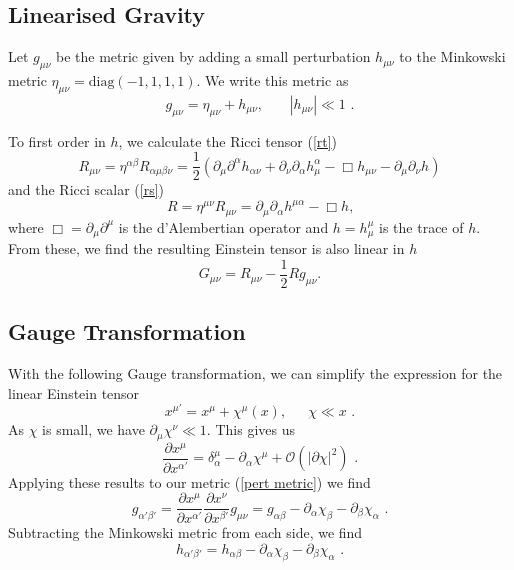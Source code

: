 \documentclass[12pt,twoside,a4paper]{report}
\newcommand{\mn}{_{\mu\nu}}
\newcommand{\fs}{\text{ .}}
\newcommand{\pd}{\partial}
\begin{document}
\subsection{Linearised Gravity}
Let $g\mn$ be the metric given by adding a small perturbation $h_{\mu\nu}$ to the Minkowski metric $\eta\mn=\text{diag}(-1,1,1,1)$. We write this metric as 
\begin{equation} \label{pert metric}
g\mn=\eta_{\mu\nu}+h_{\mu\nu} \text{, } \hspace{20pt} |h_{\mu\nu}| \ll 1 \text{ .}
\end{equation}

To first order in $h$, we calculate the Ricci tensor (\ref{rt})
\begin{equation} \label{lin rt}
R\mn =\eta^{\alpha \beta}R_{\alpha \mu \beta \nu} = \frac{1}{2}\left( \pd_\mu \pd ^\alpha h_{\alpha \nu} + \pd_\nu \pd_\alpha h^\alpha_\mu -\Box h\mn -\pd_\mu \pd_\nu h \right)
\end{equation}
and the Ricci scalar (\ref{rs}) 
\begin{equation} \label{lin rs}
R=\eta^{\mu \nu}R\mn=\pd _\mu \pd_ \alpha h^{\mu \alpha} - \Box h \textbf{,}
\end{equation}
where $\Box=\pd_\mu \pd^\mu $ is the d'Alembertian operator and $h=h^\mu_\mu$ is the trace of $h$. From these, we find the resulting Einstein tensor is also linear in $h$ 
\begin{equation} \label{lin Einstein}
G\mn =R\mn -\frac{1}{2} R g\mn \textbf{.}
\end{equation}

\subsection{Gauge Transformation}
With the following Gauge transformation, we can simplify the expression for the linear Einstein tensor
\begin{equation}
x^{\mu'}=x^\mu +\chi ^\mu (x)\text{,} \hspace{20pt}\chi \ll x\fs
\end{equation} 
As $\chi$ is small, we have $\partial_\mu \chi^\nu \ll 1$. This gives us
\begin{equation}
\frac{\pd x^\mu}{\pd x^{\alpha'}}=\delta^\mu_\alpha-\pd_\alpha\chi^\mu +\mathcal{O}(|\pd \chi|^2) \fs
\end{equation}  
Applying these results to our metric (\ref{pert metric}) we find
\begin{equation} 
g_{\alpha' \beta'}=\frac{\pd x^\mu}{\pd x^{\alpha'}}\frac{\pd x^\nu}{\pd x^{\beta'}}g\mn=g_{\alpha \beta}-\pd_\alpha \chi_\beta -\pd_\beta \chi_\alpha \fs
\end{equation}
Subtracting the Minkowski metric from each side, we find 
\begin{equation} \label{pert transf}
h_{\alpha' \beta'}=h_{\alpha \beta}-\pd_\alpha\chi_\beta-\pd_\beta\chi_\alpha \fs
\end{equation}
\end{document}

